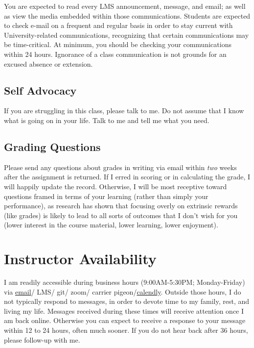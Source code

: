 You are expected to read every LMS announcement, message, and email; as well as view the media embedded within those communications. Students are expected to check e-mail on a frequent and regular basis in order to stay current with University-related communications, recognizing that certain communications may be time-critical. At minimum, you should be checking your communications within 24 hours. Ignorance of a class communication is not grounds for an excused absence or extension.

\hypertarget{self-advocacy-1}{%
\subsection{Self Advocacy}\label{self-advocacy-1}}

If you are struggling in this class, please talk to me. Do not assume that I know what is going on in your life. Talk to me and tell me what you need.

\hypertarget{grading-questions}{%
\subsection{Grading Questions}\label{grading-questions}}

Please send any questions about grades in writing via email within \emph{two} weeks after the assignment is returned. If I erred in scoring or in calculating the grade, I will happily update the record. Otherwise, I will be most receptive toward questions framed in terms of your learning (rather than simply your performance), as research has shown that focusing overly on extrinsic rewards (like grades) is likely to lead to all sorts of outcomes that I don't wish for you (lower interest in the course material, lower learning, lower enjoyment).

\hypertarget{instructor-availability}{%
\section{Instructor Availability}\label{instructor-availability}}

I am readily accessible during business hours (9:00AM-5:30PM; Monday-Friday) via \href{garrissm@wfu.edu}{email}/ LMS/ git/ zoom/ carrier pigeon/\href{https://calendly.com/smasongarrison/}{calendly}. Outside those hours, I do not typically respond to messages, in order to devote time to my family, rest, and living my life. Messages received during these times will receive attention once I am back online. Otherwise you can expect to receive a response to your message within 12 to 24 hours, often much sooner. If you do not hear back after 36 hours, please follow-up with me.

